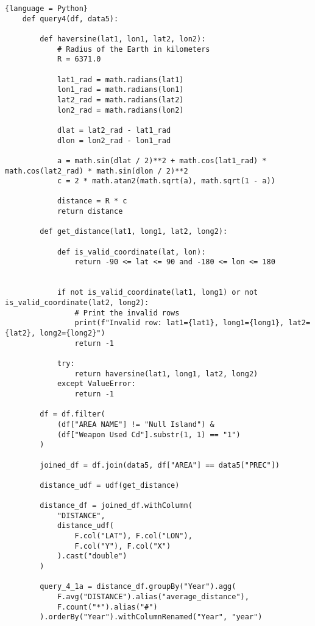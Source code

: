 \documentclass{article}
\begin{document}
\vspace{5mm}

\begin{lstlisting}{language = Python}
    def query4(df, data5):

        def haversine(lat1, lon1, lat2, lon2):
            # Radius of the Earth in kilometers
            R = 6371.0

            lat1_rad = math.radians(lat1)
            lon1_rad = math.radians(lon1)
            lat2_rad = math.radians(lat2)
            lon2_rad = math.radians(lon2)

            dlat = lat2_rad - lat1_rad
            dlon = lon2_rad - lon1_rad

            a = math.sin(dlat / 2)**2 + math.cos(lat1_rad) * math.cos(lat2_rad) * math.sin(dlon / 2)**2
            c = 2 * math.atan2(math.sqrt(a), math.sqrt(1 - a))

            distance = R * c
            return distance

        def get_distance(lat1, long1, lat2, long2):

            def is_valid_coordinate(lat, lon):
                return -90 <= lat <= 90 and -180 <= lon <= 180


            if not is_valid_coordinate(lat1, long1) or not is_valid_coordinate(lat2, long2):
                # Print the invalid rows
                print(f"Invalid row: lat1={lat1}, long1={long1}, lat2={lat2}, long2={long2}")
                return -1

            try:
                return haversine(lat1, long1, lat2, long2)
            except ValueError:
                return -1

        df = df.filter(
            (df["AREA NAME"] != "Null Island") &
            (df["Weapon Used Cd"].substr(1, 1) == "1")
        )

        joined_df = df.join(data5, df["AREA"] == data5["PREC"])

        distance_udf = udf(get_distance)

        distance_df = joined_df.withColumn(
            "DISTANCE",
            distance_udf(
                F.col("LAT"), F.col("LON"),
                F.col("Y"), F.col("X")
            ).cast("double")
        )

        query_4_1a = distance_df.groupBy("Year").agg(
            F.avg("DISTANCE").alias("average_distance"),
            F.count("*").alias("#")
        ).orderBy("Year").withColumnRenamed("Year", "year")


\end{lstlisting}
\end{document}
